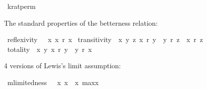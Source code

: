 \begin{isabellebody}
\isamarkupfalse%
\ kratperm\ {\isacharcolon}{\kern0pt}{\isacharcolon}{\kern0pt}\ {\isachardoublequoteopen}{\isasymsigma}{\isasymRightarrow}{\isasymsigma}{\isasymRightarrow}{\isasymsigma}{\isachardoublequoteclose}\ {\isacharparenleft}{\kern0pt}{\isachardoublequoteopen}{\isasymtimes}{\isacharless}{\kern0pt}{\isacharunderscore}{\kern0pt}{\isacharbar}{\kern0pt}{\isacharunderscore}{\kern0pt}{\isachargreater}{\kern0pt}{\isachardoublequoteclose}{\isacharparenright}{\kern0pt}\ \isanewline
\ \ \ {\isachardoublequoteopen}{\isasymtimes}{\isacharless}{\kern0pt}{\isasympsi}{\isacharbar}{\kern0pt}{\isasymphi}{\isachargreater}{\kern0pt}\ {\isasymequiv}\isactrlbold {\isasymnot}{\isasymominus}{\isacharless}{\kern0pt}\isactrlbold {\isasymnot}{\isasympsi}{\isacharbar}{\kern0pt}{\isasymphi}{\isachargreater}{\kern0pt}{\isachardoublequoteclose}%
\isadelimdocument
%
\endisadelimdocument
%
\isatagdocument
%
\isamarkuptrue%
%
\endisatagdocument
{\isafolddocument}%
%
\isadelimdocument
%
\endisadelimdocument
%
\begin{isamarkuptext}%
The standard properties of the betterness relation:%
\end{isamarkuptext}\isamarkuptrue%
\isamarkupfalse%
\ {\isachardoublequoteopen}reflexivity\ \ {\isasymequiv}\ {\isacharparenleft}{\kern0pt}{\isasymforall}x{\isachardot}{\kern0pt}\ x\ \isactrlbold r\ x{\isacharparenright}{\kern0pt}{\isachardoublequoteclose}\isanewline
{}\isamarkupfalse%
\ {\isachardoublequoteopen}transitivity\ {\isasymequiv}\ {\isacharparenleft}{\kern0pt}{\isasymforall}x\ y\ z{\isachardot}{\kern0pt}\ {\isacharparenleft}{\kern0pt}x\ \isactrlbold r\ y\ {\isasymand}\ y\ \isactrlbold r\ z{\isacharparenright}{\kern0pt}\ {\isasymlongrightarrow}\ x\ \isactrlbold r\ z{\isacharparenright}{\kern0pt}{\isachardoublequoteclose}\isanewline
{}\isamarkupfalse%
\ {\isachardoublequoteopen}totality\ {\isasymequiv}\ {\isacharparenleft}{\kern0pt}{\isasymforall}x\ y{\isachardot}{\kern0pt}\ {\isacharparenleft}{\kern0pt}x\ \isactrlbold r\ y\ {\isasymor}\ y\ \isactrlbold r\ x{\isacharparenright}{\kern0pt}{\isacharparenright}{\kern0pt}{\isachardoublequoteclose}%
\begin{isamarkuptext}%
4 versions of Lewis's limit assumption:%
\end{isamarkuptext}\isamarkuptrue%
\isamarkupfalse%
\ {\isachardoublequoteopen}mlimitedness\ {\isasymequiv}\ {\isacharparenleft}{\kern0pt}{\isasymforall}{\isasymphi}{\isachardot}{\kern0pt}\ {\isacharparenleft}{\kern0pt}{\isasymexists}x{\isachardot}{\kern0pt}\ {\isacharparenleft}{\kern0pt}{\isasymphi}{\isacharparenright}{\kern0pt}x{\isacharparenright}{\kern0pt}\ {\isasymlongrightarrow}\ {\isacharparenleft}{\kern0pt}{\isasymexists}x{\isachardot}{\kern0pt}\ max{\isacharless}{\kern0pt}{\isasymphi}{\isachargreater}{\kern0pt}x{\isacharparenright}{\kern0pt}{\isacharparenright}{\kern0pt}{\isachardoublequoteclose}\isanewline

\end{isabellebody}
